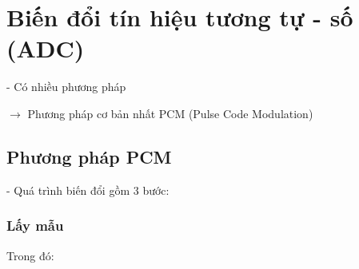 \chapter{Biến đổi tín hiệu tương tự - số (ADC)}
- Có nhiều phương pháp

$\rightarrow$ Phương pháp cơ bản nhất PCM (Pulse Code Modulation)

\section{Phương pháp PCM}
- Quá trình biến đổi gồm 3 bước:

\begin{center}
\end{center}

\subsection{Lấy mẫu}
\begin{center}
    \begin{minipage}[b]{0.49\linewidth}
        \centering
        \setlength{\parskip}{0pt}
        \offinterlineskip
        \resizebox{\linewidth}{!}{}\par
        \vspace{3pt}
    \end{minipage}\hfill%
    \begin{minipage}[b]{0.49\linewidth}
        \centering
        \setlength{\parskip}{0pt}
        \offinterlineskip
        \resizebox{\linewidth}{!}{}\par
        \vspace{3pt}
    \end{minipage}
\end{center}

\noindent Trong đó:\nopagebreak


